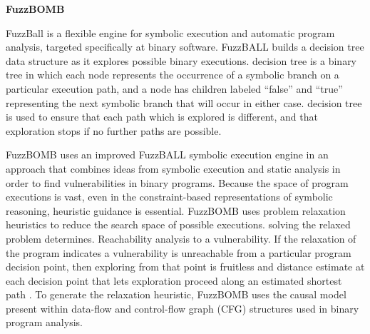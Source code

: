 \documentclass[a4paper, 11pt]{article}
\begin{document}
\noindent
\textbf{FuzzBOMB}

FuzzBall is a flexible engine for symbolic execution and automatic program analysis, targeted specifically at binary software. FuzzBALL builds a decision tree data structure as it explores possible binary executions. decision tree is a binary tree in which each node represents the occurrence of a symbolic branch on a particular execution path, and a node has children labeled ``false'' and ``true'' representing the next symbolic branch that will occur
in either case. decision tree is used to ensure that each path which is explored is different, and that exploration stops if no further paths are possible. 

FuzzBOMB uses an improved FuzzBALL symbolic execution engine in an approach that combines ideas from symbolic execution and static analysis in order to find vulnerabilities in binary programs. Because the space of program executions is vast, even in the constraint-based representations of symbolic reasoning, heuristic guidance is essential. FuzzBOMB uses problem relaxation heuristics to reduce the search space of possible executions. solving the relaxed problem determines. Reachability analysis to a vulnerability. If the relaxation of the program indicates a vulnerability is unreachable from a particular program decision point, then exploring from that point is fruitless and distance estimate at each decision point that lets exploration proceed along an estimated shortest path \cite{fuzzbomb}. To generate the relaxation heuristic, FuzzBOMB uses the causal model present within data-flow and control-flow graph (CFG) structures used in binary program analysis.
\end{document}

